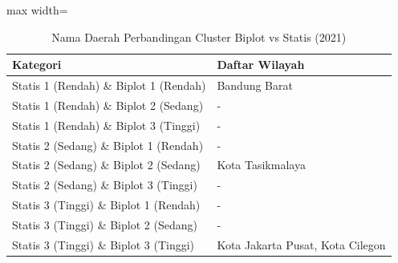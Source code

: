 \begin{table}[H]
\centering
\caption{Nama Daerah Perbandingan Cluster Biplot vs Statis (2021)} \label{tab:samplebiplot_statis_name_2021}
\begin{adjustbox}{max width=\textwidth}
\begin{tabular}{|p{4cm}|p{10cm}|}
\hline
\textbf{Kategori} & \textbf{Daftar Wilayah} \\
\hline
Statis 1 (Rendah) \& Biplot 1 (Rendah) & Bandung Barat \\
\hline
Statis 1 (Rendah) \& Biplot 2 (Sedang) & - \\
\hline
Statis 1 (Rendah) \& Biplot 3 (Tinggi) & - \\
\hline
Statis 2 (Sedang) \& Biplot 1 (Rendah) & - \\
\hline
Statis 2 (Sedang) \& Biplot 2 (Sedang) & Kota Tasikmalaya \\
\hline
Statis 2 (Sedang) \& Biplot 3 (Tinggi) & - \\
\hline
Statis 3 (Tinggi) \& Biplot 1 (Rendah) & - \\
\hline
Statis 3 (Tinggi) \& Biplot 2 (Sedang) & - \\
\hline
Statis 3 (Tinggi) \& Biplot 3 (Tinggi) & Kota Jakarta Pusat, Kota Cilegon \\
\hline
\end{tabular}
\end{adjustbox}
\end{table}